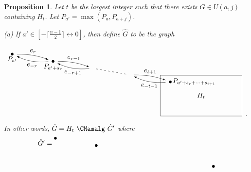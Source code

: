 \documentclass{amsproc}
\newtheorem{proposition}[theorem]{Proposition}
\theoremstyle{definition}
\theoremstyle{remark}
\numberwithin{equation}{section}
\newcommand{\nodeDist}{2}
\newcommand{\interval}{\longleftrightarrow}
\begin{document}
\begin{proposition}\label{max_graph_decomp}
Let $t$ be the largest integer such that there exists $G\in U(a,j)$ containing $H_t$.  Let $P_{a'}=\max(P_a,P_{a+j})$.

\smallskip
(a) If $a'\in[-\lceil \frac{n-1}{2} \rceil \interval 0]$, then define $\hat G$ to be the graph

\renewcommand{\nodeDist}{2}
\[
\begin{tikzpicture}[vertex/.style={circle, fill,minimum size=4pt, inner sep=0pt, outer sep=0pt},auto,
                               edge/.style={->,>=latex, shorten > = 5pt,shorten < = 5pt},
position/.style args={#1:#2 from #3}{
    at=(#3.#1), anchor=#1+180, shift=(#1:#2)
}]
  \node[vertex] (v1) {};
  \node[vertex,position = -10:{\nodeDist} from v1] (v2) {};
  \coordinate[position = -10:{\nodeDist} from v2] (v3);
  \coordinate[position = -10:{\nodeDist} from v3] (v4) {};
  \node[vertex,position = -10:{\nodeDist} from v4] (v5) {};
  \node[draw, anchor=north west,rectangle, minimum height=60pt, minimum width=120pt,xshift=-15pt, yshift=10pt] (Hm) at (v5) {$H_t$};

  \draw (v1) node[below] {$P_{a'}$};
  \draw (v2) node[below] {$P_{a'+s_{r}}$};
  \draw (v5) node[right] {$P_{a'+s_{r}+\dots+s_{t+1}}$};

  \draw[edge] (v1) to [bend left=10] node[above] {$e_{r}$} (v2);
  \draw[edge] (v2) to [bend left=15] node[below] {$e_{-r}$} (v1);

  \draw[edge] (v2) to [bend left=10] node[above] {$e_{r-1}$} (v3);
  \draw[edge] (v3) to [bend left=15] node[below] {$e_{-r+1}$} (v2);

  \draw[dashed,shorten > = 5pt, shorten < = 5pt] (v3) -- (v4);

  \draw[edge] (v4) to [bend left=10] node[above] {$e_{t+1}$} (v5);
  \draw[edge] (v5) to [bend left=15] node[below] {$e_{-t-1}$} (v4);
\end{tikzpicture}\enskip .
\]
In other words, $\hat G=H_t\ \CMamalg\ \hat G'$ where
\renewcommand{\nodeDist}{2}
\[\hat G'=
\begin{tikzpicture}[baseline,vertex/.style={anchor=base, circle, fill,minimum size=4pt, inner sep=0pt, outer sep=0pt},auto,
                               edge/.style={->,>=latex, shorten > = 5pt,shorten < = 5pt},
position/.style args={#1:#2 from #3}{
    at=(#3.#1), anchor=#1+180, shift=(#1:#2)
}]
  \node[vertex] (v2) {};
  \node[vertex,position = 170:{\nodeDist} from v2] (v1) {};
  \coordinate[position = -10:{\nodeDist} from v2] (v3);
  \coordinate[position = -10:{\nodeDist} from v3] (v4) {};
  \node[vertex,position = -10:{\nodeDist} from v4] (v5) {};


\end{tikzpicture}\]
\end{proposition}
\end{document}
